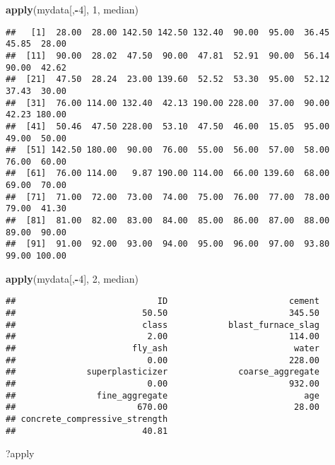\documentclass[]{article}
\newenvironment{Shaded}{\begin{snugshade}}{\end{snugshade}}
\newcommand{\DecValTok}[1]{\textcolor[rgb]{0.00,0.00,0.81}{#1}}
\newcommand{\KeywordTok}[1]{\textcolor[rgb]{0.13,0.29,0.53}{\textbf{#1}}}
\newcommand{\NormalTok}[1]{#1}
\newcommand{\OperatorTok}[1]{\textcolor[rgb]{0.81,0.36,0.00}{\textbf{#1}}}
\begin{document}
\begin{Shaded}
\begin{Highlighting}[]
\KeywordTok{apply}\NormalTok{(mydata[,}\OperatorTok{-}\DecValTok{4}\NormalTok{], }\DecValTok{1}\NormalTok{, median)}
\end{Highlighting}
\end{Shaded}

\begin{verbatim}
##   [1]  28.00  28.00 142.50 142.50 132.40  90.00  95.00  36.45  45.85  28.00
##  [11]  90.00  28.02  47.50  90.00  47.81  52.91  90.00  56.14  90.00  42.62
##  [21]  47.50  28.24  23.00 139.60  52.52  53.30  95.00  52.12  37.43  30.00
##  [31]  76.00 114.00 132.40  42.13 190.00 228.00  37.00  90.00  42.23 180.00
##  [41]  50.46  47.50 228.00  53.10  47.50  46.00  15.05  95.00  49.00  50.00
##  [51] 142.50 180.00  90.00  76.00  55.00  56.00  57.00  58.00  76.00  60.00
##  [61]  76.00 114.00   9.87 190.00 114.00  66.00 139.60  68.00  69.00  70.00
##  [71]  71.00  72.00  73.00  74.00  75.00  76.00  77.00  78.00  79.00  41.30
##  [81]  81.00  82.00  83.00  84.00  85.00  86.00  87.00  88.00  89.00  90.00
##  [91]  91.00  92.00  93.00  94.00  95.00  96.00  97.00  93.80  99.00 100.00
\end{verbatim}

\begin{Shaded}
\begin{Highlighting}[]
\KeywordTok{apply}\NormalTok{(mydata[,}\OperatorTok{-}\DecValTok{4}\NormalTok{], }\DecValTok{2}\NormalTok{, median)}
\end{Highlighting}
\end{Shaded}

\begin{verbatim}
##                            ID                        cement 
##                         50.50                        345.50 
##                         class            blast_furnace_slag 
##                          2.00                        114.00 
##                       fly_ash                         water 
##                          0.00                        228.00 
##              superplasticizer              coarse_aggregate 
##                          0.00                        932.00 
##                fine_aggregate                           age 
##                        670.00                         28.00 
## concrete_compressive_strength 
##                         40.81
\end{verbatim}

\begin{Shaded}
\begin{Highlighting}[]
\NormalTok{?apply}
\end{Highlighting}
\end{Shaded}
\end{document}
